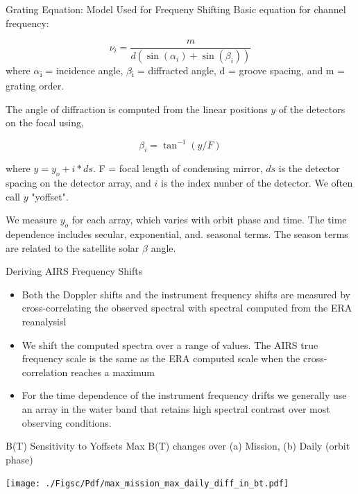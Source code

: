 \documentclass[10pt,t]{beamer}
\begin{document}
\begin{frame}[label={sec:org3ce0780},shrink=10]{Grating Equation: Model Used for Frequeny Shifting}
Basic equation for channel frequency:

\begin{displaymath}
\nu_i = \frac{m}{d(\sin(\alpha_i) + \sin(\beta_i))}
\end{displaymath}
where 
\(\alpha\)\textsubscript{i} = incidence angle, \(\beta\)\textsubscript{i} = diffracted angle, d = groove spacing, and m = grating order. 

The angle of diffraction is computed from the linear positions \(y\) of the detectors on the focal using,

\begin{displaymath}
\beta_i = \tan^{-1}(y/F)
\end{displaymath}

where \(y = y_o + i*ds\). F = focal length of condensing mirror, \(ds\) is the detector spacing on the detector array, and \(i\) is the index nunber of the detector.  We often call \(y\) "yoffset".

We measure \(y_o\) for each array, which varies with orbit phase and time.  The time dependence includes secular, exponential, and. seasonal terms.  The season terms are related to the satellite solar \(\beta\) angle.
\end{frame}

\begin{frame}[label={sec:org8a960e1}]{Deriving AIRS Frequency Shifts}
\begin{itemize}
\item Both the Doppler shifts and the instrument frequency shifts are measured by cross-correlating the observed spectral with spectral computed from the ERA reanalysisl
\item We shift the computed spectra over a range of values.  The AIRS true frequency scale is the same as the ERA computed scale when the cross-correlation reaches a maximum
\item For the time dependence of the instrument frequency drifts we generally use an array in the water band that retains high spectral contrast over most observing conditions.
\end{itemize}
\end{frame}
\begin{frame}[label={sec:org20efd55}]{B(T) Sensitivity to Yoffsets}
Max B(T) changes over (a) Mission, (b) Daily (orbit phase)

\begin{center}
\texttt{[image: ./Figsc/Pdf/max\_mission\_max\_daily\_diff\_in\_bt.pdf]}
\end{center}
\end{frame}
\end{document}
